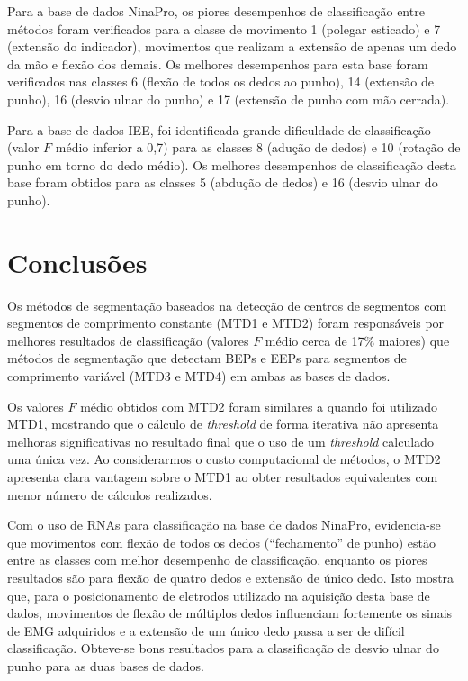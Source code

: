 

Para a base de dados NinaPro, os piores desempenhos de classificação entre métodos foram verificados para a classe de movimento 1 (polegar esticado) e 7 (extensão do indicador), movimentos que realizam a extensão de apenas um dedo da mão e flexão dos demais. Os melhores desempenhos para esta base foram verificados nas classes 6 (flexão de todos os dedos ao punho), 14 (extensão de punho), 16 (desvio ulnar do punho) e 17 (extensão de punho com mão cerrada).

Para a base de dados IEE, foi identificada grande dificuldade de classificação (valor $F$ médio inferior a 0,7) para as classes 8 (adução de dedos) e 10 (rotação de punho em torno do dedo médio). Os melhores desempenhos de classificação desta base foram obtidos para as classes 5 (abdução de dedos) e 16 (desvio ulnar do punho).

	\chapter{Conclusões}
Os métodos de segmentação baseados na detecção de centros de segmentos com segmentos de comprimento constante (MTD1 e MTD2) foram responsáveis por melhores resultados de classificação (valores $F$ médio cerca de 17\% maiores) que métodos de segmentação que detectam BEPs e EEPs para segmentos de comprimento variável (MTD3 e MTD4) em ambas as bases de dados.

Os valores $F$ médio obtidos com MTD2 foram similares a quando foi utilizado MTD1, mostrando que o cálculo de \emph{threshold} de forma iterativa não apresenta melhoras significativas no resultado final que o uso de um \emph{threshold} calculado uma única vez. Ao considerarmos o custo computacional de métodos, o MTD2 apresenta clara vantagem sobre o MTD1 ao obter resultados equivalentes com menor número de cálculos realizados.

Com o uso de RNAs para classificação na base de dados NinaPro, evidencia-se que movimentos com flexão de todos os dedos (``fechamento'' de punho) estão entre as classes com melhor desempenho de classificação, enquanto os piores resultados são para flexão de quatro dedos e extensão de único dedo. Isto mostra que, para o posicionamento de eletrodos utilizado na aquisição desta base de dados, movimentos de flexão de múltiplos dedos influenciam fortemente os sinais de EMG adquiridos e a extensão de um único dedo passa a ser de difícil classificação. Obteve-se bons resultados para a classificação de desvio ulnar do punho para as duas bases de dados.

